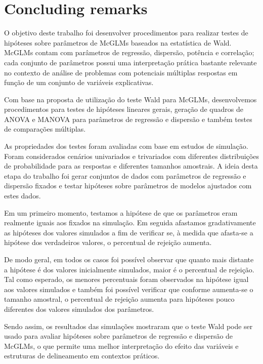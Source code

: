 \documentclass[AMA,STIX1COL]{WileyNJD-v2}
\begin{document}

\section{Concluding remarks}\label{sec7}

O objetivo deste trabalho foi desenvolver procedimentos para realizar testes de hipóteses sobre parâmetros de McGLMs baseados na estatística de Wald. McGLMs contam com parâmetros de regressão, dispersão, potência e correlação; cada conjunto de parâmetros possui uma interpretação prática bastante relevante no contexto de análise de problemas com potenciais múltiplas respostas em função de um conjunto de variáveis explicativas.

Com base na proposta de utilização do teste Wald para McGLMs, desenvolvemos procedimentos para testes de hipóteses lineares gerais, geração de quadros de ANOVA e MANOVA para parâmetros de regressão e dispersão e também testes de comparações múltiplas.

As propriedades dos testes foram avaliadas com base em estudos de simulação. Foram considerados cenários univariados e trivariados com diferentes distribuições de probabilidade para as respostas e diferentes tamanhos amostrais. A ideia desta etapa do trabalho foi gerar conjuntos de dados com parâmetros de regressão e dispersão fixados e testar hipóteses sobre parâmetros de modelos ajustados com estes dados. 

Em um primeiro momento, testamos a hipótese de que os parâmetros eram realmente iguais aos fixados na simulação. Em seguida afastamos gradativamente as hipóteses dos valores simulados a fim de verificar se, à medida que afasta-se a hipótese dos verdadeiros valores, o percentual de rejeição aumenta. 

De modo geral, em todos os casos foi possível observar que quanto mais distante a hipótese é dos valores inicialmente simulados, maior é o percentual de rejeição. Tal como esperado, os menores percentuais foram observados na hipótese igual aos valores simulados e também foi possível verificar que conforme aumenta-se o tamanho amostral, o percentual de rejeição aumenta para hipóteses pouco diferentes dos valores simulados dos parâmetros.

Sendo assim, os resultados das simulações mostraram que o teste Wald pode ser usado para avaliar hipóteses sobre parâmetros de regressão e dispersão de McGLMs, o que permite uma melhor interpretação do efeito das variáveis e estruturas de delineamento em contextos práticos.
\end{document}
